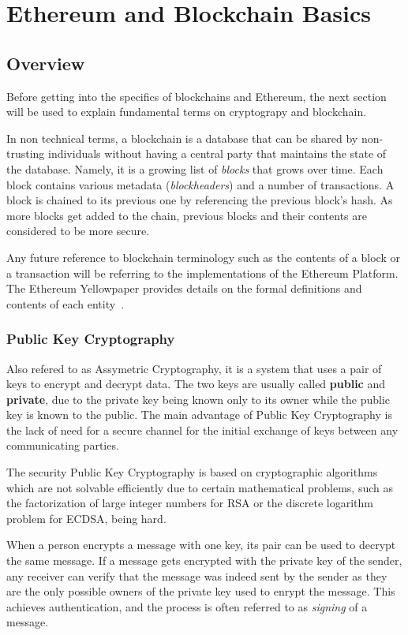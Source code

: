 \chapter{Ethereum and Blockchain Basics}
\section{Overview}
Before getting into the specifics of blockchains and Ethereum, the next section will be used to explain fundamental terms on cryptograpy and blockchain.

In non technical terms, a blockchain is a database that can be shared by non-trusting individuals without having a central party that maintains the state of the database. Namely, it is a growing list of \textit{blocks} that grows over time. Each block contains various metadata (\textit{blockheaders}) and a number of transactions. A block is chained to its previous one by referencing the previous block's hash. As more blocks get added to the chain, previous blocks and their contents are considered to be more secure.

Any future reference to blockchain terminology such as the contents of a block or a transaction will be referring to the implementations of the Ethereum Platform. The Ethereum Yellowpaper provides details on the formal definitions and contents of each entity~\cite{ethereum}.

\subsection{Public Key Cryptography}
Also refered to as Assymetric Cryptography, it is a system that uses a pair of keys to encrypt and decrypt data. The two keys are usually called \textbf{public} and \textbf{private}, due to the private key being known only to its owner while the public key is known to the public. The main advantage of Public Key Cryptography is the lack of need for a secure channel for the initial exchange of keys between any communicating parties.

The security Public Key Cryptography is based on cryptographic algorithms which are not solvable efficiently due to certain mathematical problems, such as the factorization of large integer numbers for RSA or the discrete logarithm problem for ECDSA, being hard.

When a person encrypts a message with one key, its pair can be used to decrypt the same message. If a message gets encrypted with the private key of the sender, any receiver can verify that the message was indeed sent by the sender as they are the only possible owners of the private key used to enrypt the message. This achieves authentication, and the process is often referred to as \textit{signing} of a message. 

